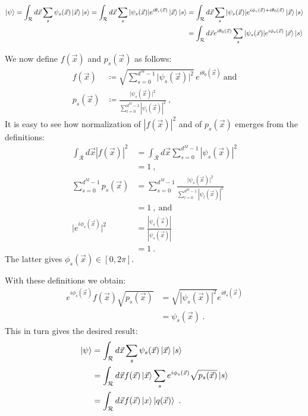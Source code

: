 \documentclass[draft,nofootinbib,pre,twocolumn,showpacs,showkeys,preprintnumbers,floatfix]{revtex4-1}
\newcommand{\1}{\mathbbm{1}}
\begin{document}
\begin{align*}
\ket{\psi} = \int_{\mathcal{R}} d\vec{x} \sum_{s} \psi_s(\vec{x})\ket{\vec{x}} \ket{s} = \int_{\mathcal{R}} d\vec{x} \sum_{s} \vert \psi_s(\vec{x}) \vert e^{i\theta_s(\vec{x})}\ket{\vec{x}} \ket{s} & =  \int_{\mathcal{R}} d\vec{x} \sum_{s} \vert \psi_s(\vec{x}) \vert e^{i\phi_s(\vec{x})+i\theta_0(\vec{x})}\ket{\vec{x}} \ket{s} \\ & = \int_{\mathcal{R}} d\vec{x} e^{i\theta_0(\vec{x})}\sum_{s} \vert \psi_s(\vec{x}) \vert e^{i\phi_s(\vec{x})}\ket{\vec{x}} \ket{s}
\end{align*}



We now define $f(\vec{x})$ and $p_s(\vec{x})$ as follows:
\begin{align*}
f(\vec{x}) & \coloneqq \sqrt{\sum_{s=0}^{d^M-1} \vert \psi_s(\vec{x}) \vert^2}
  \, e^{i \theta_0(\vec{x})} ~\text{and} \\
p_s(\vec{x}) & \coloneqq
  \frac{\vert \psi_s(\vec{x})\vert^2}{\sum_{l=0}^{d^M-1}\left\vert \psi_l(\vec{x})\right\vert^2}
  ~,
\end{align*}
It is easy to see how normalization of $|f(\vec{x})|^2$ and of $p_s(\vec{x})$ emerges from the definitions:
\begin{align*}
\int_{\mathcal{R}} d\vec{x} \left\vert f(\vec{x})\right\vert^2
  & = \int_{\mathcal{R}} d\vec{x}
  \sum_{s=0}^{d^M-1} \left\vert \psi_s(\vec{x}) \right\vert^2 \\
  & = 1 ~,\\
\sum_{s=0}^{d^M-1} p_s(\vec{x})
  & = \sum_{s=0}^{d^M-1}
  \frac{\vert \psi_s(\vec{x})\vert^2}{\sum_{l=0}^{d^M-1}\left\vert
  \psi_l(\vec{x})\right\vert^2} \\
  & = 1 ~,~\text{and} \\
\vert e^{i\phi_s(\vec{x})}\vert^2
  & = \frac{|\psi_s(\vec{s})|}{|\psi_s(\vec{x})|} \\
  & = 1
  ~.
\end{align*}
The latter gives $\phi_s(\vec{x}) \in [0,2\pi]$.

With these definitions we obtain:
\begin{align*}
e^{i\phi_s(\vec{x})} f(\vec{x}) \sqrt{p_s(\vec{x})}
  & = \sqrt{|\psi_s(\vec{x})|^2} e^{i\theta_s(\vec{x})} \\
  & = \psi_s(\vec{x})
  ~.
\end{align*}
This in turn gives the desired result:
\begin{align*}
\ket{\psi} & = \int_{\mathcal{R}} d\vec{x} \sum_{s} \psi_s(\vec{x})\ket{\vec{x}} \ket{s} \\
& = \int_{\mathcal{R}} d\vec{x} f(\vec{x}) \ket{\vec{x}}\sum_{s} e^{i\phi_s(\vec{x})}   \sqrt{p_s(\vec{x})}  \ket{s} \\
& = \int_{\mathcal{R}}d\vec{x} f(\vec{x}) \ket{x}\ket{q(\vec{x})}
  ~.
\end{align*}

\end{document}
